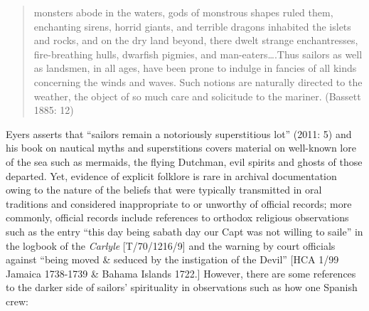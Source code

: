 \documentclass[12pt]{article}
\newenvironment{styleStandard}{\renewcommand\baselinestretch{1.0}\setlength\leftskip{0cm}\setlength\rightskip{0cm plus 1fil}\setlength\parindent{0cm}\setlength\parfillskip{0pt plus 1fil}\setlength\parskip{0in plus 1pt}\writerlistparindent\writerlistleftskip\leavevmode\normalfont\normalsize\writerlistlabel\ignorespaces}{\unskip\vspace{0in plus 1pt}\par}
\newcommand\writerlistleftskip{}
\newcommand\writerlistparindent{}
\newcommand\writerlistlabel{}
\begin{document}
\begin{quotation}
monsters abode in the waters, gods of monstrous shapes ruled them, enchanting sirens, horrid giants, and terrible dragons inhabited the islets and rocks, and on the dry land beyond, there dwelt strange enchantresses, fire-breathing hulls, dwarfish pigmies, and man-eaters….Thus sailors as well as landsmen, in all ages, have been prone to indulge in fancies of all kinds concerning the winds and waves. Such notions are naturally directed to the weather, the object of so much care and solicitude to the mariner. (Bassett 1885: 12)

\end{quotation}
\begin{styleStandard}
Eyers asserts that “sailors remain a notoriously superstitious lot” (2011: 5) and his book on nautical myths and superstitions covers material on well-known lore of the sea such as mermaids, the flying Dutchman, evil spirits and ghosts of those departed. Yet, evidence of explicit folklore is rare in archival documentation owing to the nature of the beliefs that were typically transmitted in oral traditions and considered inappropriate to or unworthy of official records; more commonly, official records include references to orthodox religious observations such as the entry “this day being sabath day our Capt was not willing to saile” in the logbook of the \textit{Carlyle} [T/70/1216/9] and the warning by court officials against “being moved \& seduced by the instigation of the Devil” [HCA 1/99 Jamaica 1738-1739 \& Bahama Islands 1722.] However, there are some references to the darker side of sailors’ spirituality in observations such as how one Spanish crew: 
\end{styleStandard}
\end{document}
